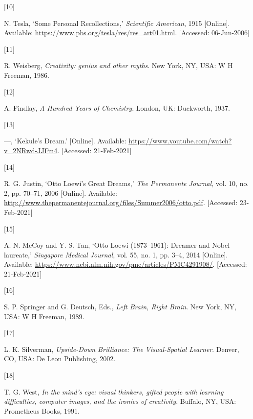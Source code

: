 \documentclass[
  12pt,
  british,
  a4paper,
]{article}
\newlength{\cslhangindent}
\newlength{\csllabelwidth}
\newenvironment{CSLReferences}[2] %
 {%
  \setlength{\parindent}{0pt}
  \ifodd #1 \everypar{\setlength{\hangindent}{\cslhangindent}}\ignorespaces\fi
  \ifnum #2 > 0
  \setlength{\parskip}{#2\baselineskip}
  \fi
 }%
 {}
\newcommand{\CSLLeftMargin}[1]{\parbox[t]{\csllabelwidth}{#1}}
\newcommand{\CSLRightInline}[1]{\parbox[t]{\linewidth - \csllabelwidth}{#1}\break}
\begin{document}
\begin{CSLReferences}{0}{0}
\leavevmode{}%
\CSLLeftMargin{{[}10{]} }
\CSLRightInline{N. Tesla, {`{Some Personal Recollections},'}
\emph{Scientific American}, 1915 {[}Online{]}. Available:
\url{https://www.pbs.org/tesla/res/res_art01.html}. {[}Accessed:
06-Jun-2006{]}}

\leavevmode{}%
\CSLLeftMargin{{[}11{]} }
\CSLRightInline{R. Weisberg, \emph{{Creativity: genius and other
myths}}. New York, NY, USA: W H Freeman, 1986. }

\leavevmode{}%
\CSLLeftMargin{{[}12{]} }
\CSLRightInline{A. Findlay, \emph{{A Hundred Years of Chemistry}}.
London, UK: Duckworth, 1937. }

\leavevmode{}%
\CSLLeftMargin{{[}13{]} }
\CSLRightInline{---, {`{Kekule's Dream}.'} {[}Online{]}. Available:
\url{https://www.youtube.com/watch?v=2NRwd-JJFm4}. {[}Accessed:
21-Feb-2021{]}}

\leavevmode{}%
\CSLLeftMargin{{[}14{]} }
\CSLRightInline{R. G. Justin, {`{Otto Loewi's Great Dreams},'} \emph{The
Permanente Journal}, vol. 10, no. 2, pp. 70--71, 2006 {[}Online{]}.
Available:
\url{http://www.thepermanentejournal.org/files/Summer2006/otto.pdf}.
{[}Accessed: 23-Feb-2021{]}}

\leavevmode{}%
\CSLLeftMargin{{[}15{]} }
\CSLRightInline{A. N. McCoy and Y. S. Tan, {`{Otto Loewi (1873--1961):
Dreamer and Nobel laureate},'} \emph{Singapore Medical Journal}, vol.
55, no. 1, pp. 3--4, 2014 {[}Online{]}. Available:
\url{https://www.ncbi.nlm.nih.gov/pmc/articles/PMC4291908/}.
{[}Accessed: 21-Feb-2021{]}}

\leavevmode{}%
\CSLLeftMargin{{[}16{]} }
\CSLRightInline{S. P. Springer and G. Deutsch, Eds., \emph{{Left Brain,
Right Brain}}. New York, NY, USA: W H Freeman, 1989. }

\leavevmode{}%
\CSLLeftMargin{{[}17{]} }
\CSLRightInline{L. K. Silverman, \emph{{Upside-Down Brilliance: The
Visual-Spatial Learner}}. Denver, CO, USA: De Leon Publishing, 2002. }

\leavevmode{}%
\CSLLeftMargin{{[}18{]} }
\CSLRightInline{T. G. West, \emph{{In the mind's eye: visual thinkers,
gifted people with learning difficulties, computer images, and the
ironies of creativity}}. Buffalo, NY, USA: Prometheus Books, 1991. }


\end{CSLReferences}
\end{document}

